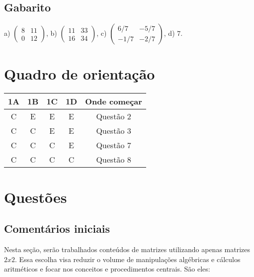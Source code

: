 \documentclass[main_estudante.tex]{subfiles}
\begin{document}
\paraTutores
\subsection{Gabarito}

a) $\begin{pmatrix}8 & 11 \\ 0 & 12\end{pmatrix}$, b) $\begin{pmatrix}11 & 33 \\ 16 & 34\end{pmatrix}$, c) $\begin{pmatrix}6/7 & -5/7 \\ -1/7 & -2/7\end{pmatrix}$, d) $7$.

\section{Quadro de orientação}

\begin{center}
 \begin{tabular}{|c c c c |c|} 
 \hline
 1A & 1B & 1C & 1D & Onde começar\\
 \hline
 C & E & E & E & Questão 2 \\ 
 \hline
 C & C & E & E & Questão 3 \\ 
 \hline
 C & C & C & E & Questão 7 \\ 
 \hline
 C & C & C & C & Questão 8 \\ 
 \hline
\end{tabular}
\end{center}


\paraAmbos


\section{Questões}

\paraTutores

\subsection{Comentários iniciais}

Nesta seção, serão trabalhados conteúdos de matrizes utilizando apenas matrizes $2x2$. Essa escolha visa reduzir o volume de manipulações algébricas e cálculos aritméticos e focar nos conceitos e procedimentos centrais. São eles:
\end{document}
